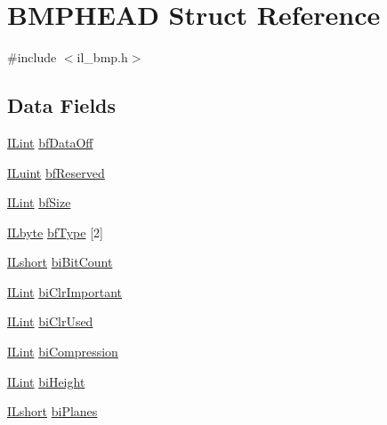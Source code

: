 \hypertarget{struct_b_m_p_h_e_a_d}{\section{B\-M\-P\-H\-E\-A\-D Struct Reference}
\label{struct_b_m_p_h_e_a_d}
}


{\ttfamily \#include $<$il\-\_\-bmp.\-h$>$}

\subsection*{Data Fields}
\begin{DoxyCompactItemize}
\item 
\hyperlink{il_8h_a288a97fb9e92e707a60b749d0039fafe}{I\-Lint} \hyperlink{struct_b_m_p_h_e_a_d_a8dd362728b942453cc2653be42fac9c5}{bf\-Data\-Off}
\item 
\hyperlink{il_8h_ac6508d0e9c19e32f32e00d54b5b8cf30}{I\-Luint} \hyperlink{struct_b_m_p_h_e_a_d_ab264abc55d4995b16a617c9f226a45d7}{bf\-Reserved}
\item 
\hyperlink{il_8h_a288a97fb9e92e707a60b749d0039fafe}{I\-Lint} \hyperlink{struct_b_m_p_h_e_a_d_af8764a5f474c909322255ae1059735d5}{bf\-Size}
\item 
\hyperlink{il_8h_a88e562dacd22f4efcf6f9d31b85d4f92}{I\-Lbyte} \hyperlink{struct_b_m_p_h_e_a_d_add094573b01c629ca83b0c0b23fb52c9}{bf\-Type} \mbox{[}2\mbox{]}
\item 
\hyperlink{il_8h_afc75ded918970afe7517d3f7f0561db3}{I\-Lshort} \hyperlink{struct_b_m_p_h_e_a_d_a305e27fd90ae036b93d5e1abf7618681}{bi\-Bit\-Count}
\item 
\hyperlink{il_8h_a288a97fb9e92e707a60b749d0039fafe}{I\-Lint} \hyperlink{struct_b_m_p_h_e_a_d_a616964dac66166511408063b9def4bc2}{bi\-Clr\-Important}
\item 
\hyperlink{il_8h_a288a97fb9e92e707a60b749d0039fafe}{I\-Lint} \hyperlink{struct_b_m_p_h_e_a_d_a340bc026d69d4b8ee955f8f2e2c1509d}{bi\-Clr\-Used}
\item 
\hyperlink{il_8h_a288a97fb9e92e707a60b749d0039fafe}{I\-Lint} \hyperlink{struct_b_m_p_h_e_a_d_a5dbac74adbc3aa3924b742a8885d3299}{bi\-Compression}
\item 
\hyperlink{il_8h_a288a97fb9e92e707a60b749d0039fafe}{I\-Lint} \hyperlink{struct_b_m_p_h_e_a_d_ae5cbf1dff9414e869f6eaf723de1adb1}{bi\-Height}
\item 
\hyperlink{il_8h_afc75ded918970afe7517d3f7f0561db3}{I\-Lshort} \hyperlink{struct_b_m_p_h_e_a_d_a8defe9733f472d9a1733b2f9b39d8146}{bi\-Planes}

\end{DoxyCompactItemize}
